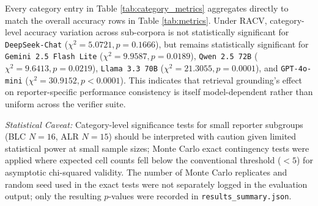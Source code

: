 \documentclass[conference]{IEEEtran}
\begin{document}
\begin{table}[htbp]
\caption{Category-Level Accuracy \& Raw Count Breakdown across Primary Verifier Suite}
\label{tab:category_metrics}
\centering
{}
\end{table}

Every category entry in Table \ref{tab:category_metrics} aggregates directly to match the overall accuracy rows in Table \ref{tab:metrics}. Under RACV, category-level accuracy variation across sub-corpora is not statistically significant for \texttt{DeepSeek-Chat} ($\chi^2 = 5.0721, p = 0.1666$), but remains statistically significant for \texttt{Gemini 2.5 Flash Lite} ($\chi^2 = 9.9587, p = 0.0189$), \texttt{Qwen 2.5 72B} ($\chi^2 = 9.6413, p = 0.0219$), \texttt{Llama 3.3 70B} ($\chi^2 = 21.3055, p = 0.0001$), and \texttt{GPT-4o-mini} ($\chi^2 = 30.9152, p < 0.0001$). This indicates that retrieval grounding's effect on reporter-specific performance consistency is itself model-dependent rather than uniform across the verifier suite.

\textit{Statistical Caveat:} Category-level significance tests for small reporter subgroups (BLC $N=16$, ALR $N=15$) should be interpreted with caution given limited statistical power at small sample sizes; Monte Carlo exact contingency tests were applied where expected cell counts fell below the conventional threshold ($<5$) for asymptotic chi-squared validity. The number of Monte Carlo replicates and random seed used in the exact tests were not separately logged in the evaluation output; only the resulting $p$-values were recorded in \texttt{results\_summary.json}.
\end{document}
